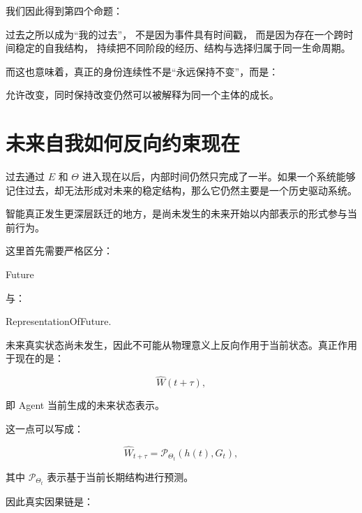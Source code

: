 我们因此得到第四个命题：

\begin{proposition*}
过去之所以成为“我的过去”，
不是因为事件具有时间戳，
而是因为存在一个跨时间稳定的自我结构，
持续把不同阶段的经历、结构与选择归属于同一生命周期。
\end{proposition*}

而这也意味着，真正的身份连续性不是“永远保持不变”，而是：

\begin{statementbox}
允许改变，同时保持改变仍然可以被解释为同一个主体的成长。
\end{statementbox}

\section{未来自我如何反向约束现在}

过去通过 $E$ 和 $\Theta$ 进入现在以后，内部时间仍然只完成了一半。如果一个系统能够记住过去，却无法形成对未来的稳定结构，那么它仍然主要是一个历史驱动系统。

智能真正发生更深层跃迁的地方，是尚未发生的未来开始以内部表示的形式参与当前行为。

这里首先需要严格区分：

\begin{statementbox}
Future
\end{statementbox}

与：

\begin{statementbox}
RepresentationOfFuture.
\end{statementbox}

未来真实状态尚未发生，因此不可能从物理意义上反向作用于当前状态。真正作用于现在的是：

\[
\hat{W}(t+\tau),
\]

即 Agent 当前生成的未来状态表示。

这一点可以写成：

\[
\hat{W}_{t+\tau}
=
\mathcal{P}_{\Theta_t}
\left(
h(t),G_t
\right),
\]

其中 $\mathcal{P}_{\Theta_t}$ 表示基于当前长期结构进行预测。

因此真实因果链是：

\begin{statementbox}
\centering
{}
\end{statementbox}

